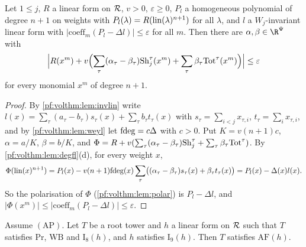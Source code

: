 \begin{lemma}\label{pf:volthm:lem:corb}
Let $1\le j$, $R$ a linear form on $\mathcal{R}$, $v>0$, $\varepsilon\ge0$, $P_l$ a homogeneous polynomial of degree
$n+1$ on weights with $P_l(\lambda)=R(\mathrm{lin}(\lambda)^{n+1})$ for all $\lambda$, and $l$ a $W_j$-invariant
linear form with $|\mathrm{coeff}_m(P_l-\Delta l)|\le\varepsilon$ for all $m$. Then there are
$\alpha,\beta\in\R^\Psi$ with
\[
\Bigl|R(x^m)+v\Bigl(\sum_\tau(\alpha_\tau-\beta_\tau)\mathrm{Sh}_j^\tau(x^m)+\sum_\tau\beta_\tau\mathrm{Tot}^\tau(x^m)
\Bigr)\Bigr|\le\varepsilon
\]
for every monomial $x^m$ of degree $n+1$.
\end{lemma}

\begin{proof}
By \cref{pf:volthm:lem:invlin} write $l(x)=\sum_\tau(a_\tau-b_\tau)s_\tau(x)+\sum_\tau b_\tau t_\tau(x)$ with
$s_\tau=\sum_{i<j}x_{\tau,i}$, $t_\tau=\sum_ix_{\tau,i}$, and by \cref{pf:volthm:lem:weyl} let
$\mathrm{fdeg}=c\Delta$ with $c>0$. Put $K=v(n+1)c$, $\alpha=a/K$, $\beta=b/K$, and
$\Phi=R+v(\sum_\tau(\alpha_\tau-\beta_\tau)\mathrm{Sh}_j^\tau+\sum_\tau\beta_\tau\mathrm{Tot}^\tau)$. By
\cref{pf:volthm:lem:degfl}(d), for every weight $x$,
\[
\Phi(\mathrm{lin}(x)^{n+1})=P_l(x)-v(n+1)\mathrm{fdeg}(x)\sum_\tau\bigl((\alpha_\tau-\beta_\tau)s_\tau(x)+\beta_\tau t_\tau(x)\bigr)
=P_l(x)-\Delta(x)l(x).
\]
So the polarisation of $\Phi$ (\cref{pf:volthm:lem:polar}) is $P_l-\Delta l$, and
$|\Phi(x^m)|\le|\mathrm{coeff}_m(P_l-\Delta l)|\le\varepsilon$.
\end{proof}

\begin{proposition}\label{pf:volthm:prop:ThmB}
Assume $(\mathrm{AP})$. Let $T$ be a root tower and $h$ a linear form on $\mathcal{R}$ such that $T$
satisfies $\mathrm{Pr}$, $\mathrm{WB}$ and $\mathrm{I}_8(h)$, and $h$ satisfies $\mathrm{I}_9(h)$. Then
$T$ satisfies $\mathrm{AF}(h)$.
\end{proposition}

